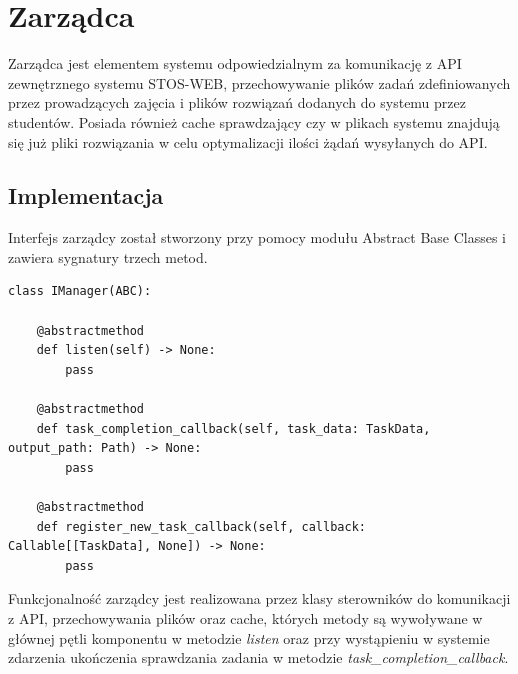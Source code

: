 \section{Zarządca}
Zarządca jest elementem systemu odpowiedzialnym za komunikację z API zewnętrznego systemu STOS-WEB, przechowywanie plików zadań zdefiniowanych przez prowadzących zajęcia i plików rozwiązań dodanych do systemu przez studentów. Posiada również cache sprawdzający czy w plikach systemu znajdują się już pliki rozwiązania w celu optymalizacji ilości żądań wysyłanych do API.

\subsection{Implementacja}
Interfejs zarządcy został stworzony przy pomocy modułu Abstract Base Classes\cite{pythonAbc} i zawiera sygnatury trzech metod.
\lstset{style=python}
\begin{lstlisting}[caption = {Interfejs zarządcy.}]
    class IManager(ABC):

    @abstractmethod
    def listen(self) -> None:
        pass

    @abstractmethod
    def task_completion_callback(self, task_data: TaskData, output_path: Path) -> None:
        pass

    @abstractmethod
    def register_new_task_callback(self, callback: Callable[[TaskData], None]) -> None:
        pass
\end{lstlisting}
Funkcjonalność zarządcy jest realizowana przez klasy sterowników do komunikacji z API, przechowywania plików oraz cache, których metody są wywoływane w głównej pętli komponentu w metodzie \textit{listen} oraz przy wystąpieniu w systemie zdarzenia ukończenia sprawdzania zadania w metodzie \textit{task\_completion\_callback}.

